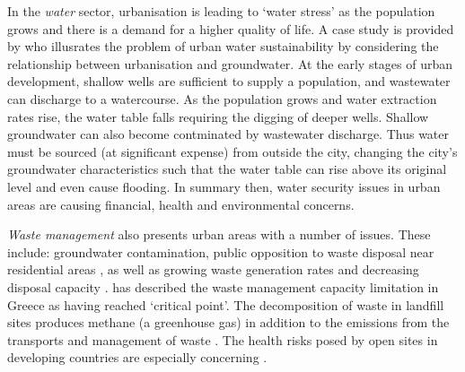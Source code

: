 In the \emph{water} sector, urbanisation is leading to `water stress' as the population grows and there is a demand for a higher quality of life. A case study is provided by \citet{Kennedy2008} who illusrates the problem of urban water sustainability by considering the relationship between urbanisation and groundwater. At the early stages of urban development, shallow wells are sufficient to supply a population, and wastewater can discharge to a watercourse. As the population grows and water extraction rates rise, the water table falls requiring the digging of deeper wells. Shallow groundwater can also become contminated by wastewater discharge. Thus water must be sourced (at significant expense) from outside the city, changing the city's groundwater characteristics such that the water table can rise above its original level and even cause flooding. In summary then, water security issues in urban areas are causing financial, health and environmental concerns.

\emph{Waste management} also presents urban areas with a number of issues. These include: groundwater contamination, public opposition to waste disposal near residential areas \citep{Li2006}, as well as growing waste generation rates and decreasing disposal capacity \citep{Lu2009}. \citet{Xydis2012} has described the waste management capacity limitation in Greece as having reached `critical point'. The decomposition of waste in landfill sites produces methane (a greenhouse gas) in addition to the emissions from the transports and management of waste \citep{ICE2011}. The health risks posed by open sites in developing countries are especially concerning \cite{Durand2013}.


